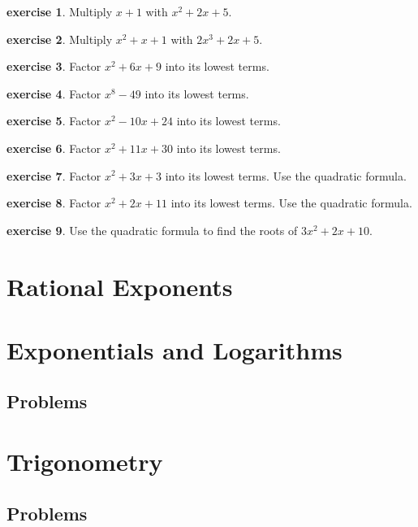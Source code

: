\documentclass{scrbook}
\theoremstyle{definition}
\newtheorem{exercise}{exercise}[subsection]
\begin{document}
\begin{exercise}
  Multiply $x + 1$ with $x^2 + 2x + 5$.
\end{exercise}

\begin{exercise}
  Multiply $x^2 + x + 1$ with $2x^3 + 2x + 5$.
\end{exercise}

\begin{exercise}
  Factor $x^2 + 6x + 9$ into its lowest terms.
\end{exercise}

\begin{exercise}
  Factor $x^8 - 49$ into its lowest terms.
\end{exercise}

\begin{exercise}
  Factor $x^2 - 10x + 24$ into its lowest terms.
\end{exercise}

\begin{exercise}
  Factor $x^2 + 11x + 30$ into its lowest terms.
\end{exercise}

\begin{exercise}
  Factor $x^2 + 3x + 3$ into its lowest terms. Use the quadratic formula. 
\end{exercise}

\begin{exercise}
  Factor $x^2 + 2x + 11$ into its lowest terms. Use the quadratic formula. 
\end{exercise}

\begin{exercise}
  Use the quadratic formula to find the roots of $3x^2 + 2x + 10$.
\end{exercise}

\section{Rational Exponents}

\section{Exponentials and Logarithms}

\subsection{Problems}

\section{Trigonometry}

\subsection{Problems}

\printbibliography
\end{document}
